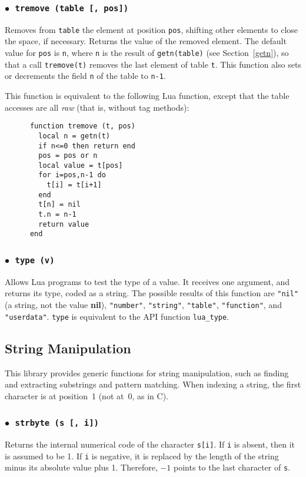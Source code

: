 \documentclass[11pt]{article}
\newcommand{\See}[1]{Section~\ref{#1}}
\newcommand{\see}[1]{(see \See{#1})}
\newcommand{\T}[1]{{\tt #1}}
\newcommand{\Math}[1]{$#1$}
\newcommand{\nil}{{\bf nil}}
\newcommand{\Deffunc}[1]{\index{#1}}
\newcommand{\ff}{$\bullet$\ }
\begin{document}
\subsubsection*{\ff \T{tremove (table [, pos])}}\Deffunc{tremove}

Removes from \verb|table| the element at position \verb|pos|,
shifting other elements to close the space, if necessary.
Returns the value of the removed element.
The default value for \verb|pos| is \verb|n|,
where \verb|n| is the result of \verb|getn(table)| \see{getn},
so that a call \verb|tremove(t)| removes the last element
of table \verb|t|.
This function also sets or decrements the field \verb|n| of the table
to \verb|n-1|.

This function is equivalent to the following Lua function,
except that the table accesses are all \emph{raw} (that is, without tag methods):
\begin{verbatim}
      function tremove (t, pos)
        local n = getn(t)
        if n<=0 then return end
        pos = pos or n
        local value = t[pos]
        for i=pos,n-1 do
          t[i] = t[i+1]
        end
        t[n] = nil
        t.n = n-1
        return value
      end
\end{verbatim}

\subsubsection*{\ff \T{type (v)}}\Deffunc{type}\label{pdf-type}
Allows Lua programs to test the type of a value.
It receives one argument, and returns its type, coded as a string.
The possible results of this function are
\verb|"nil"| (a string, not the value \nil),
\verb|"number"|,
\verb|"string"|,
\verb|"table"|,
\verb|"function"|,
and \verb|"userdata"|.
\verb|type| is equivalent to the API function \verb|lua_type|.


\subsection{String Manipulation}
This library provides generic functions for string manipulation,
such as finding and extracting substrings and pattern matching.
When indexing a string, the first character is at position~1
(not at~0, as in C).

\subsubsection*{\ff \T{strbyte (s [, i])}}\Deffunc{strbyte}
Returns the internal numerical code of the character \verb|s[i]|.
If \verb|i| is absent, then it is assumed to be 1.
If \verb|i| is negative,
it is replaced by the length of the string minus its
absolute value plus 1.
Therefore, \Math{-1} points to the last character of \verb|s|.
\end{document}

